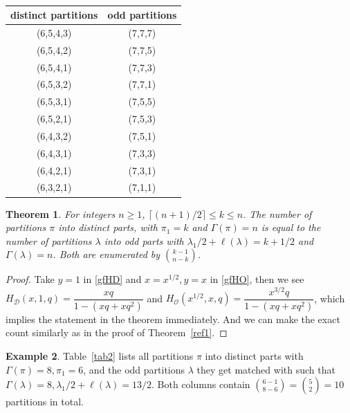 \documentclass[12pt]{amsart}
\numberwithin{equation}{section}
\theoremstyle{plain}
\newtheorem{theorem}{Theorem}[section]
\theoremstyle{definition}
\newtheorem{example}[theorem]{Example}
\def\D{\mathcal{D}}
\def\O{\mathcal{O}}
\begin{document}
\begin{table}[htbp]
\centering \caption{}
\begin{tabular}{|c|c|}
\hline
distinct partitions & odd partitions\\
\hline
(6,5,4,3) &(7,7,7)\\
\hline
(6,5,4,2) &(7,7,5)\\
\hline
(6,5,4,1) &(7,7,3)\\
\hline
(6,5,3,2) &(7,7,1)\\
\hline
(6,5,3,1) &(7,5,5)\\
\hline
(6,5,2,1) &(7,5,3)\\
\hline
(6,4,3,2) &(7,5,1)\\
\hline
(6,4,3,1) &(7,3,3)\\
\hline
(6,4,2,1) &(7,3,1)\\
\hline
(6,3,2,1) &(7,1,1)\\
\hline
\end{tabular}
\label{tab1}
\end{table}
\begin{theorem}
For integers $n\geq 1$, $\lceil (n+1)/2\rceil\leq k \leq n$. The number of partitions $\pi$ into distinct parts, with $\pi_1=k$ and $\Gamma(\pi)=n$ is equal to the number of partitions $\lambda$ into odd parts with $\lambda_1/2+\ell(\lambda)=k+1/2$ and $\Gamma(\lambda)=n$. Both are enumerated by $\binom{k-1}{n-k}$.
\end{theorem}
\begin{proof}
Take $y=1$ in \eqref{gfHD} and $x=x^{1/2},y=x$ in \eqref{gfHO}, then we see $H_{\D}(x,1,q)=\dfrac{xq}{1-(xq+xq^2)}$ and $H_{\O}(x^{1/2},x,q)=\dfrac{x^{3/2}q}{1-(xq+xq^2)}$, which implies the statement in the theorem immediately. And we can make the exact count similarly as in the proof of Theorem~\ref{ref1}.
\end{proof}
\begin{example}
Table~\ref{tab2} lists all partitions $\pi$ into distinct parts with $\Gamma(\pi)=8, \pi_{1}=6$, and the odd partitions $\lambda$ they get matched with such that $\Gamma(\lambda)=8, \lambda_1/2+\ell(\lambda)=13/2$. Both columns contain $\binom{6-1}{8-6}=\binom{5}{2}=10$ partitions in total.
\end{example}
\end{document}
